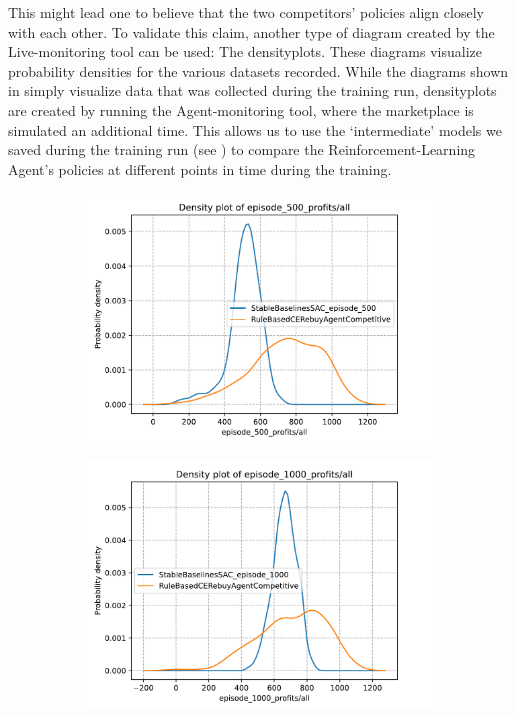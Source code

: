 This might lead one to believe that the two competitors' policies align closely with each other. To validate this claim, another type of diagram created by the Live-monitoring tool can be used: The densityplots. These diagrams visualize probability densities for the various datasets recorded. While the diagrams shown in  simply visualize data that was collected during the training run, densityplots are created by running the Agent-monitoring tool, where the marketplace is simulated an additional time. This allows us to use the `intermediate' models we saved during the training run (see ) to compare the Reinforcement-Learning Agent's policies at different points in time during the training.

\begin{figure}[t]
	\centering
	\begin{subfigure}{0.49\textwidth}
		\centering
		\includegraphics[width = \textwidth]{images/experiments/SACDuopoly/SACDuopolyProfitsDensity1.pdf}\\
		\label{fig:SACDuopolyProfitsDensity1}
	\end{subfigure}
	\begin{subfigure}{0.49\textwidth}
		\centering
		\includegraphics[width = \textwidth]{images/experiments/SACDuopoly/SACDuopolyProfitsDensity2.pdf}\\

\end{subfigure}
\end{figure}
